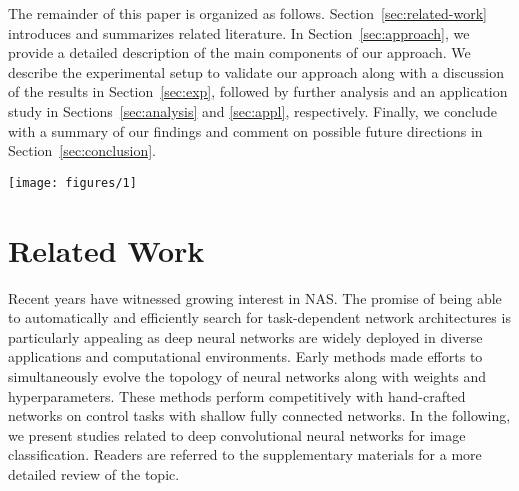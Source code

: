 \documentclass[journal]{IEEEtran}
\def\ourmethod{NSGANetV1}
\theoremstyle{definition}
\theoremstyle{remark}
\begin{document}
The remainder of this paper is organized as follows. Section~\ref{sec:related-work} introduces and summarizes related literature. In Section~\ref{sec:approach}, we provide a detailed description of the main components of our approach. We describe the experimental setup to validate our approach along with a discussion of the results in Section~\ref{sec:exp}, followed by further analysis and an application study in Sections~\ref{sec:analysis} and \ref{sec:appl}, respectively. Finally, we conclude with a summary of our findings and comment on possible future directions in Section~\ref{sec:conclusion}.







%
 \begin{figure*}[t]
    \centering
    \texttt{[image: figures/1]}
    \caption{\textbf{Overview:} Given a dataset and objectives, \ourmethod{} designs a set of custom architectures spanning the trading-off front. \ourmethod{} estimate the performance of an architecture through its \emph{proxy model}, optimized by Stochastic Gradient Descent (SGD) in the lower-level. The search proceeds in \emph{exploration} via genetic operations, followed by \emph{exploitation} via distribution estimation. See Algorithm~\ref{algo:framework} for pseudocode and colors are in correspondence.}
    \label{fig:approach_overview}
    \vspace{-1em}
\end{figure*}

\section{Related Work\label{sec:related-work}}
Recent years have witnessed growing interest in NAS. The promise of being able to automatically and efficiently search for task-dependent network architectures is particularly appealing as deep neural networks are widely deployed in diverse applications and computational environments. { Early methods \cite{yao1999evolving,stanley2002evolving} made efforts to simultaneously evolve the topology of neural networks along with weights and hyperparameters. These methods perform competitively with hand-crafted networks on control tasks with shallow fully connected networks. In the following, we present studies related to deep convolutional neural networks for image classification.  Readers are referred to the supplementary materials for a more detailed review of the topic.
}
\end{document}
